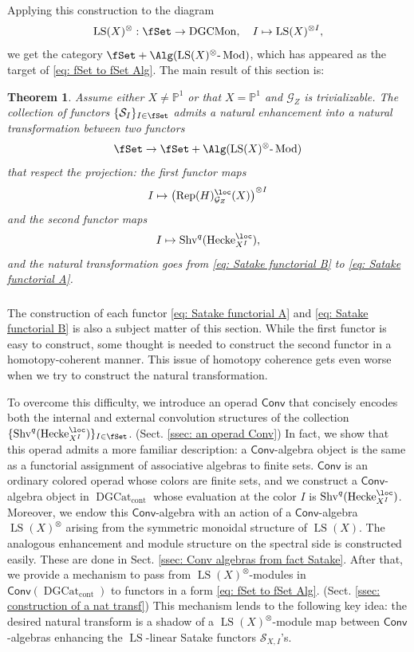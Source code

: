 \documentclass[10pt]{amsart}
\newcommand{\sssec}{\subsubsection}
\newtheorem{thm}[subsubsection]{Theorem}
\theoremstyle{remark}
\newcommand{\pjl}{\mathbb{P}^1}
\newcommand{\on}{\operatorname}
\newcommand{\cG}{\mathcal{G}}
\newcommand{\cS}{\mathcal{S}}
\newcommand{\DGcat}{\on{DGCat}_{\on{cont}}}
\newcommand{\DGCatSymMon}{\on{DGCMon}}
\newcommand{\lMod}{\text{-}\on{Mod}}
\newcommand{\Rep}{\on{Rep}}
\newcommand{\Shv}{\on{Shv}}
\newcommand{\LS}{\on{LS}}
\newcommand{\Hecke}{\on{Hecke}}
\newcommand{\Conv}{\mathsf{Conv}}
\begin{document}
Applying this construction to the diagram
\[\LS(X)^{\otimes}: \fSet\rightarrow \DGCatSymMon,\quad I\mapsto \LS(X)^{\otimes I},\]
 we get the category $\fSet+\Alg(\LS(X)^{\otimes}\lMod)$, which has appeared as the target of \eqref{eq: fSet to fSet Alg}. 
The main result of this section is:
\begin{thm}\label{thm: fact Satake nat transf}
    Assume either $X\ne \pjl$ or that $X=\pjl$ and $\cG_Z$ is trivializable. The collection of functors $\{\cS_I\}_{I\in\fSet}$ admits a natural enhancement into a natural transformation between two functors 
\[\fSet\rightarrow \fSet+ \Alg(\LS(X)^{\otimes}\lMod)\]
that respect the projection:
the first functor maps
\begin{equation}\label{eq: Satake functorial B}
    I\mapsto \left(\Rep(H)^{\loc}_{\cG_Z}(X)\right)^{\otimes I}
\end{equation}
and the second functor maps
\begin{equation}\label{eq: Satake functorial A}
    I\mapsto \Shv^q(\Hecke^{\loc}_{X^I}),
\end{equation}
and the natural transformation goes from \eqref{eq: Satake functorial B} to \eqref{eq: Satake functorial A}.
\end{thm}

\sssec{}
 The construction of each functor \eqref{eq: Satake functorial A} and \eqref{eq: Satake functorial B} is also a subject matter of this section. While the first functor is easy to construct, some thought is needed to construct the second functor in a homotopy-coherent manner. This issue of homotopy coherence gets even worse when we try to construct the natural transformation.
\medskip

To overcome this difficulty, we introduce an operad $\Conv$ that concisely encodes both the internal and external convolution structures of the collection $\{\Shv^q(\Hecke^{\loc}_{X^I})\}_{I\in\fSet}$. (Sect. \ref{ssec: an operad Conv}) In fact, we show that this operad admits a more familiar description: a $\Conv$-algebra object is the same as a functorial assignment of associative algebras to finite sets. $\Conv$ is an ordinary colored operad whose colors are finite sets, and we construct a $\Conv$-algebra object in $\DGcat$ whose evaluation at the color $I$ is $\Shv^q(\Hecke^{\loc}_{X^I})$. Moreover, we endow this $\Conv$-algebra with an action of a $\Conv$-algebra $\LS(X)^{\otimes}$ arising from the symmetric monoidal structure of $\LS(X)$. The analogous enhancement and module structure on the spectral side is constructed easily. These are done in Sect. \ref{ssec: Conv algebras from fact Satake}. After that, we provide a mechanism to pass from $\LS(X)^{\otimes}$-modules in $\Conv(\DGcat)$ to functors in a form \eqref{eq: fSet to fSet Alg}. (Sect. \ref{ssec: construction of a nat transf}) This mechanism lends to the following key idea: the desired natural transform is a shadow of a $\LS(X)^{\otimes}$-module map between $\Conv$-algebras enhancing the $\LS$-linear Satake functors $\cS_{X,I}$'s.
\medskip
\end{document}
